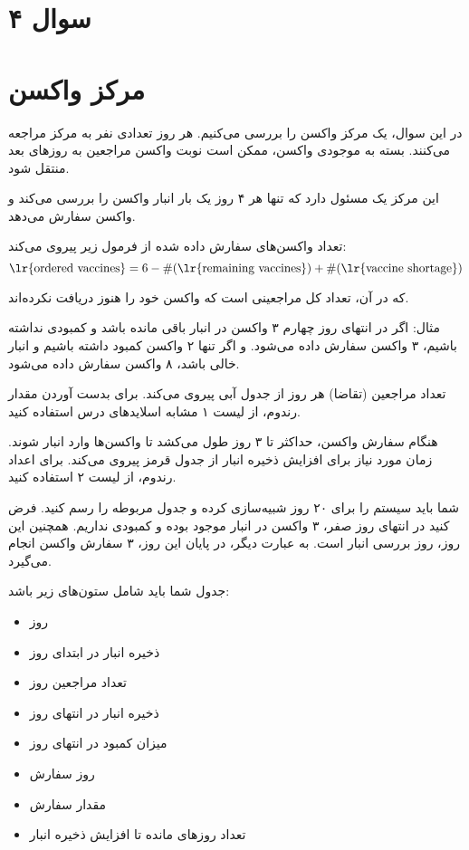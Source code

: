 \section*{سوال ۴}

\section*{مرکز واکسن}

در این سوال، یک مرکز واکسن را بررسی می‌کنیم. هر روز تعدادی نفر به مرکز مراجعه می‌کنند. بسته به موجودی واکسن، ممکن است نوبت واکسن مراجعین به روزهای بعد منتقل شود.

این مرکز یک مسئول دارد که تنها هر ۴ روز یک بار انبار واکسن را بررسی می‌کند و واکسن سفارش می‌دهد.

تعداد واکسن‌های سفارش داده شده از فرمول زیر پیروی می‌کند:
\[ \text{\lr{ordered vaccines}} = 6 - \#(\text{\lr{remaining vaccines}}) + \#(\text{\lr{vaccine shortage}}) \]
	
که در آن، 
تعداد کل مراجعینی است که واکسن خود را هنوز دریافت نکرده‌اند.

مثال: اگر در انتهای روز چهارم ۳ واکسن در انبار باقی مانده باشد و کمبودی نداشته باشیم، ۳ واکسن سفارش داده می‌شود. و اگر تنها ۲ واکسن کمبود داشته باشیم و انبار خالی باشد، ۸ واکسن سفارش داده می‌شود.


تعداد مراجعین (تقاضا) هر روز از جدول آبی پیروی می‌کند. برای بدست آوردن مقدار رندوم، از لیست ۱ مشابه اسلایدهای درس استفاده کنید.

هنگام سفارش واکسن، حداکثر تا ۳ روز طول می‌کشد تا واکسن‌ها وارد انبار شوند. زمان مورد نیاز برای افزایش ذخیره انبار از جدول قرمز پیروی می‌کند. برای اعداد رندوم، از لیست ۲ استفاده کنید.

شما باید سیستم را برای ۲۰ روز شبیه‌سازی کرده و جدول مربوطه را رسم کنید. فرض کنید در انتهای روز صفر، ۳ واکسن در انبار موجود بوده و کمبودی نداریم. همچنین این روز، روز بررسی انبار است. به عبارت دیگر، در پایان این روز، ۳ سفارش واکسن انجام می‌گیرد.

جدول شما باید شامل ستون‌های زیر باشد:

\begin{itemize}
	\item روز
	\item ذخیره انبار در ابتدای روز
	\item تعداد مراجعین روز
	\item ذخیره انبار در انتهای روز
	\item میزان کمبود در انتهای روز
	\item روز سفارش
	\item مقدار سفارش
	\item تعداد روزهای مانده تا افزایش ذخیره انبار
\end{itemize}

